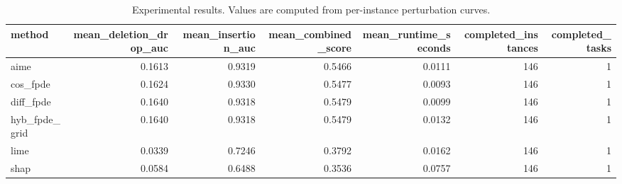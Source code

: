 \begin{table}[t]
\caption{Experimental results. Values are computed from per-instance perturbation curves.}
\label{tab:main_results_computed}
\centering
\begin{tabular}{lrrrrrr}
\toprule
method & mean\_deletion\_drop\_auc & mean\_insertion\_auc & mean\_combined\_score & mean\_runtime\_seconds & completed\_instances & completed\_tasks \\
\midrule
aime & 0.1613 & 0.9319 & 0.5466 & 0.0111 & 146 & 1 \\
cos\_fpde & 0.1624 & 0.9330 & 0.5477 & 0.0093 & 146 & 1 \\
diff\_fpde & 0.1640 & 0.9318 & 0.5479 & 0.0099 & 146 & 1 \\
hyb\_fpde\_grid & 0.1640 & 0.9318 & 0.5479 & 0.0132 & 146 & 1 \\
lime & 0.0339 & 0.7246 & 0.3792 & 0.0162 & 146 & 1 \\
shap & 0.0584 & 0.6488 & 0.3536 & 0.0757 & 146 & 1 \\
\bottomrule
\end{tabular}

\end{table}
